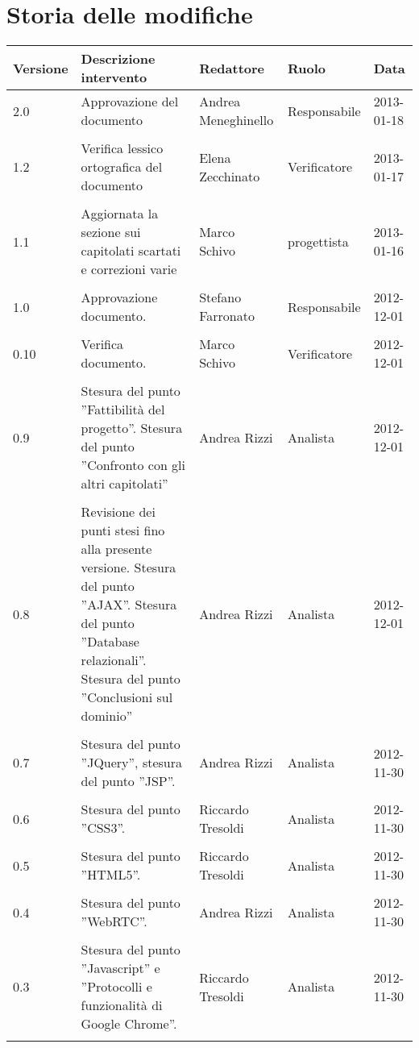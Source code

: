 \section*{Storia delle modifiche}
\begin{longtable}{lp{}lll}
\toprule
Versione & Descrizione intervento & Redattore & Ruolo & Data\\
\midrule %

2.0 & Approvazione del documento & Andrea Meneghinello &Responsabile& 2013-01-18\\\\
1.2 & Verifica lessico ortografica del documento & Elena Zecchinato &Verificatore& 2013-01-17\\\\
1.1 & Aggiornata la sezione sui capitolati scartati e correzioni varie & Marco Schivo &progettista& 2013-01-16\\\\
1.0 & Approvazione documento. & Stefano Farronato &Responsabile& 2012-12-01\\\\
0.10 & Verifica documento. & Marco Schivo &Verificatore& 2012-12-01\\\\
0.9 & Stesura del punto ''Fattibilità del progetto''. Stesura del punto ''Confronto con gli altri capitolati'' & Andrea Rizzi &Analista& 2012-12-01\\\\
0.8 & Revisione dei punti stesi fino alla presente versione. Stesura del punto ''AJAX''. Stesura del punto ''Database relazionali''. Stesura del punto ''Conclusioni sul dominio'' & Andrea Rizzi &Analista& 2012-12-01\\\\
0.7 & Stesura del punto ''JQuery'', stesura del punto ''JSP''. & Andrea Rizzi &Analista& 2012-11-30\\\\
0.6 & Stesura del punto ''CSS3''. & Riccardo Tresoldi &Analista& 2012-11-30\\\\
0.5 & Stesura del punto ''HTML5''. & Riccardo Tresoldi&Analista& 2012-11-30\\\\
0.4 & Stesura del punto ''WebRTC''. & Andrea Rizzi &Analista& 2012-11-30\\\\
0.3 & Stesura del punto ''Javascript'' e ''Protocolli e funzionalità di Google Chrome''.  & Riccardo Tresoldi &Analista& 2012-11-30\\\\

\end{longtable}
